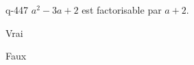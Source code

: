 \begin{truefalse}{q-447}
$a^2-3a+2$ est factorisable par $a+2$.
\item Vrai
\item* Faux
\end{truefalse}

